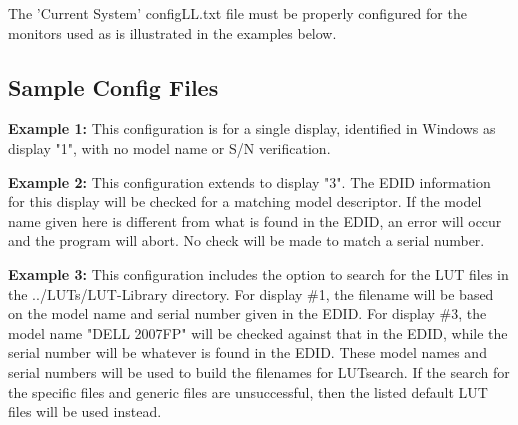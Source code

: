  The 'Current System' \textnormal{configLL.txt} file must be properly configured for the monitors used as is illustrated in the examples below.

\subsection{Sample Config Files}

\textbf{Example 1:} This configuration is for a single display, identified in Windows as display "1", with no model name or S/N verification. 



\textbf{Example 2:} This configuration extends to display "3". The EDID information for this display will be checked for a matching model descriptor. If the model name given here is different from what is found in the EDID, an error will occur and the program will abort. No check will be made to match a serial number. 


\textbf{Example 3:} This configuration includes the option to search for the LUT files in the \textnormal{../LUTs/LUT-Library} directory. For display \#1, the filename will be based on the model name and serial number given in the EDID. For display \#3, the model name "DELL 2007FP" will be checked against that in the EDID, while the serial number will be whatever is found in the EDID. These model names and serial numbers will be used to build the filenames for LUTsearch. If the search for the specific files and generic files are unsuccessful, then the listed default LUT files will be used instead. 

